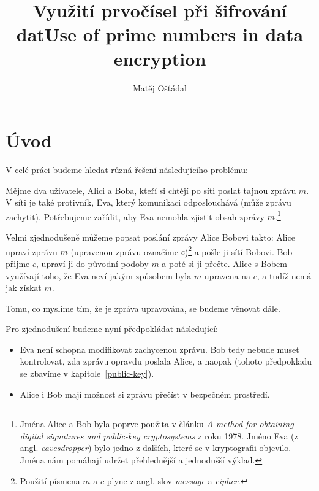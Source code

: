 \documentclass[
  program=infoi,
  biblatex,
  figures=false,
  glossaries,
  index
]{kidiplom}
\title{Využití prvočísel při šifrování dat}
\title[english]{Use of prime numbers in data encryption}
\author{Matěj Ošťádal}
\begin{document}
\maketitle



\newcommand{\BibLaTeX}{\textsc{Bib}\LaTeX}

\part{Úvod}\label{introduction}


    V celé práci budeme hledat různá řešení následujícího problému:

    \medskip
    Mějme dva uživatele, Alici a Boba, kteří si chtějí po síti poslat tajnou zprávu $m$.
    V síti je také protivník, Eva, který komunikaci odposlouchává (může zprávu zachytit). Potřebujeme zařídit, aby Eva
    nemohla zjistit obsah zprávy $m$.\footnote{Jména Alice a Bob byla poprve použita v článku 
    \emph{A method for obtaining digital signatures and public-key cryptosystems} z roku 1978.
    Jméno Eva (z angl. \emph{eavesdropper}) bylo jedno z dalších, které se v kryptografii objevilo.
    Jména nám pomáhají udržet přehlednější a jednodušší výklad.}

    Velmi zjednodušeně můžeme popsat poslání zprávy Alice Bobovi takto:
    Alice upraví zprávu $m$ (upravenou zprávu označíme $c$)\footnote{Použití písmena $m$ a $c$ plyne z angl. slov \emph{message} a \emph{cipher}.}
    a pošle ji sítí Bobovi.
    Bob přijme $c$, upraví ji do původní podoby $m$ a poté si ji přečte.
    Alice s Bobem využívají toho, že Eva neví jakým způsobem byla $m$ upravena na $c$, a tudíž nemá jak získat $m$.

    \medskip
    Tomu, co myslíme tím, že je zpráva upravována, se budeme věnovat dále.

    \bigskip
    Pro zjednodušení budeme nyní předpokládat následující:

    \begin{itemize}
        \item
            Eva není schopna modifikovat zachycenou zprávu.
            Bob tedy nebude muset kontrolovat, zda zprávu opravdu poslala Alice, a naopak
            (tohoto předpokladu se zbavíme v kapitole~\ref{public-key}).
        \item
            Alice i Bob mají možnost si zprávu přečíst v bezpečném prostředí.
    \end{itemize}
\end{document}
